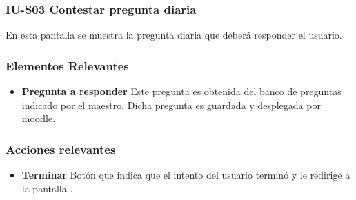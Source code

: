 
\subsubsection{IU-S03  Contestar pregunta diaria}

 En esta pantalla se muestra la pregunta diaria que deberá responder el usuario.


\subsubsection{Elementos Relevantes}

    \begin{itemize}
    \item {\bf Pregunta a responder}
        Este pregunta es obtenida del banco de preguntas indicado por el maestro. Dicha pregunta es guardada y desplegada por moodle.
    \end{itemize}

\subsubsection{Acciones relevantes}

    \begin{itemize}
    \item {\bf Terminar}
        Botón que indica que el intento del usuario terminó y le redirige a la pantalla .
    \end{itemize}

\clearpage
